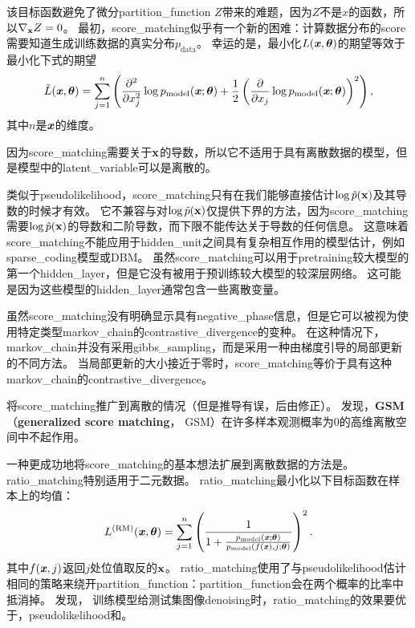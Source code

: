 该目标函数避免了微分\gls{partition_function} $Z$带来的难题，因为$Z$不是$x$的函数，所以$\nabla_{\mathbf{x}} Z = 0$。
最初，\gls{score_matching}似乎有一个新的困难：计算数据分布的\gls{score}需要知道生成训练数据的真实分布$p_{\text{data}}$。
幸运的是，最小化$L(\boldsymbol{\mathit{x}}, \boldsymbol{\theta})$的期望等效于最小化下式的期望
\begin{equation}
	\tilde{L} (\boldsymbol{\mathit{x}}, \boldsymbol{\theta}) = \sum_{j=1}^n \left( \frac{\partial^2}{ \partial x_j^2 } 
	\log p_{\text{model}} (\boldsymbol{\mathit{x}}; \boldsymbol{\theta}) + \frac{1}{2} \left( \frac{\partial}{ \partial x_j }
	\log p_{\text{model}} (\boldsymbol{\mathit{x}}; \boldsymbol{\theta})
  \right)^2
\right),
\end{equation}
其中$n$是$\boldsymbol{\mathit{x}}$的维度。


因为\gls{score_matching}需要关于$\mathbf{x}$的导数，所以它不适用于具有离散数据的模型，但是模型中的\gls{latent_variable}可以是离散的。


类似于\gls{pseudolikelihood}，\gls{score_matching}只有在我们能够直接估计$\log \tilde{p}(\mathbf{x})$及其导数的时候才有效。
它不兼容与对$\log \tilde{p}(\mathbf{x})$仅提供下界的方法，因为\gls{score_matching}需要$\log \tilde{p}(\mathbf{x})$的导数和二阶导数，而下限不能传达关于导数的任何信息。
这意味着\gls{score_matching}不能应用于\gls{hidden_unit}之间具有复杂相互作用的模型估计，例如\gls{sparse_coding}模型或\gls{DBM}。
虽然\gls{score_matching}可以用于\gls{pretraining}较大模型的第一个\gls{hidden_layer}，但是它没有被用于预训练较大模型的较深层网络。
这可能是因为这些模型的\gls{hidden_layer}通常包含一些离散变量。


虽然\gls{score_matching}没有明确显示具有\gls{negative_phase}信息，但是它可以被视为使用特定类型\gls{markov_chain}的\gls{contrastive_divergence}的变种\citep{Hyvarinen-2007b}。
在这种情况下，\gls{markov_chain}并没有采用\gls{gibbs_sampling}，而是采用一种由梯度引导的局部更新的不同方法。
当局部更新的大小接近于零时，\gls{score_matching}等价于具有这种\gls{markov_chain}的\gls{contrastive_divergence}。


\cite{Lyu09}将\gls{score_matching}推广到离散的情况（但是推导有误，后由\cite{Marlin10Inductive-small}修正）。
\cite{Marlin10Inductive-small}发现，\textbf{\gls{GSM}}（\textbf{generalized score matching}， GSM）在许多样本观测概率为$0$的高维离散空间中不起作用。


一种更成功地将\gls{score_matching}的基本想法扩展到离散数据的方法是\citep{Hyvarinen-2007}。
\gls{ratio_matching}特别适用于二元数据。
\gls{ratio_matching}最小化以下目标函数在样本上的均值：
\begin{equation}
	L^{(\text{RM})} (\boldsymbol{\mathit{x}}, \boldsymbol{\theta}) = \sum_{j=1}^n \left( 
	\frac{1}{ 1 + \frac{ p_{\text{model}}(\boldsymbol{\mathit{x}}; \boldsymbol{\theta}) }{ p_{\text{model}}(f(\boldsymbol{\mathit{x}}), j; \boldsymbol{\theta}) } } 
\right)^2.
\end{equation}
其中$f(\boldsymbol{\mathit{x}}, j)$返回$j$处位值取反的$\mathbf{x}$。
\gls{ratio_matching}使用了与\gls{pseudolikelihood}估计相同的策略来绕开\gls{partition_function}：\gls{partition_function}会在两个概率的比率中抵消掉。
\cite{Marlin10Inductive-small}发现，
训练模型给测试集图像\gls{denoising}时，\gls{ratio_matching}的效果要优于，\gls{pseudolikelihood}和。


